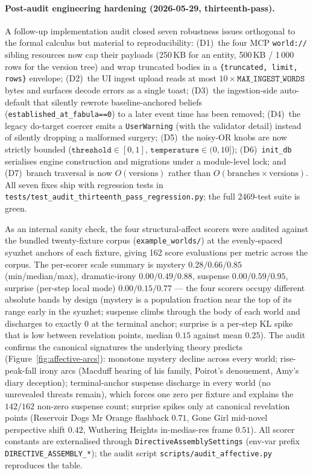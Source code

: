 \documentclass[11pt]{article}
\begin{document}
\paragraph{Post-audit engineering hardening
(2026-05-29, thirteenth-pass).} A follow-up implementation
audit closed seven robustness issues orthogonal to the formal
calculus but material to reproducibility:
(D1)~the four MCP \texttt{world://} sibling resources now cap
their payloads (250\,KB for an entity, 500\,KB / 1\,000 rows
for the version tree) and wrap truncated bodies in a
\texttt{\{truncated, limit, rows\}} envelope; (D2)~the UI
ingest upload reads at most $10\times\texttt{MAX\_INGEST\_WORDS}$
bytes and surfaces decode errors as a single toast;
(D3)~the ingestion-side auto-default that silently rewrote
baseline-anchored beliefs (\texttt{established\_at\_fabula==0})
to a later event time has been removed; (D4)~the legacy
do-target coercer emits a \texttt{UserWarning} (with the
validator detail) instead of silently dropping a malformed
surgery; (D5)~the noisy-OR knobs are now strictly bounded
($\texttt{threshold}\in[0,1]$, $\texttt{temperature}\in(0,10]$);
(D6)~\texttt{init\_db} serialises engine construction and
migrations under a module-level lock; and (D7)~branch traversal
is now $O(\text{versions})$ rather than
$O(\text{branches}\times\text{versions})$. All seven fixes ship
with regression tests in
\texttt{tests/test\_audit\_thirteenth\_pass\_regression.py};
the full 2469-test suite is green.

As an internal sanity check, the four structural-affect scorers
were audited against the bundled twenty-fixture corpus
(\texttt{example\_worlds/}) at the evenly-spaced syuzhet anchors
of each fixture, giving 162 score evaluations per metric across
the corpus. The per-scorer scale summary is
mystery $0.28/0.66/0.85$ (min/median/max), dramatic-irony
$0.00/0.49/0.88$, suspense $0.00/0.59/0.95$, surprise (per-step
local mode) $0.00/0.15/0.77$ --- the four scorers occupy
different absolute bands by design (mystery is a population
fraction near the top of its range early in the syuzhet; suspense
climbs through the body of each world and discharges to exactly
$0$ at the terminal anchor; surprise is a per-step KL spike that
is low between revelation points, median $0.15$ against mean
$0.25$). The audit confirms the canonical signatures the
underlying theory predicts (Figure~\ref{fig:affective-arcs}):
monotone mystery decline across every
world; rise-peak-fall irony arcs (Macduff hearing of his family,
Poirot's denouement, Amy's diary deception); terminal-anchor
suspense discharge in every world (no unrevealed threats remain),
which forces one zero per fixture and explains the $142/162$
non-zero suspense count; surprise spikes only at canonical
revelation points (Reservoir Dogs Mr Orange flashback $0.71$,
Gone Girl mid-novel perspective shift $0.42$, Wuthering Heights
in-medias-res frame $0.51$). All
scorer constants are externalised through
\texttt{DirectiveAssemblySettings} (env-var prefix
\texttt{DIRECTIVE\_ASSEMBLY\_*}); the audit script
\texttt{scripts/audit\_affective.py} reproduces the table.
\end{document}
